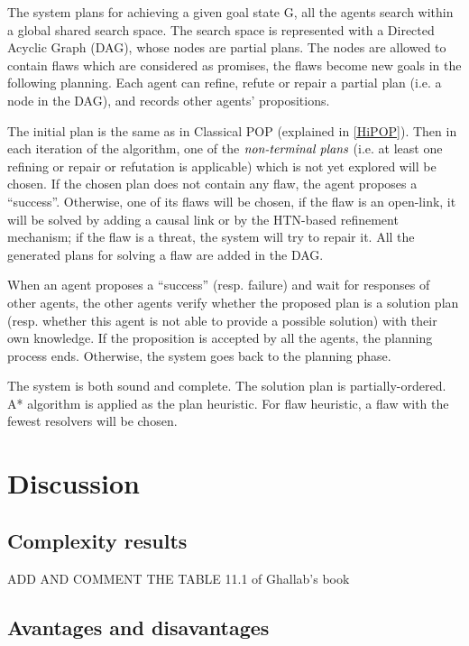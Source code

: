 The system plans for achieving a given goal state G, all the agents search within a global shared search space. The search space is represented with a Directed Acyclic Graph (DAG), whose nodes are partial plans. The nodes are allowed to contain flaws which are considered as promises, the flaws become new goals in the following planning. Each agent can refine, refute or repair a partial plan (i.e. a node in the DAG), and records other agents’ propositions. 

The initial plan is the same as in Classical POP (explained in \autoref{HiPOP}). Then in each iteration of the algorithm, one of the $\emph{non-terminal plans}$ (i.e. at least one refining or repair or refutation is applicable) which is not yet explored will be chosen. If the chosen plan does not contain any flaw, the agent proposes a “success”. Otherwise, one of its flaws will be chosen, if the flaw is an open-link, it will be solved by adding a causal link or by the HTN-based refinement mechanism; if the flaw is a threat, the system will try to repair it. All the generated plans for solving a flaw are added in the DAG.

When an agent proposes a “success” (resp. failure) and wait for responses of other agents, the other agents verify whether the proposed plan is a solution plan (resp. whether this agent is not able to provide a possible solution) with their own knowledge. If the proposition is accepted by all the agents, the planning process ends. Otherwise, the system goes back to the planning phase.

The system is both sound and complete. The solution plan is partially-ordered. A* algorithm is applied as the plan heuristic. For flaw heuristic, a flaw with the fewest resolvers will be chosen. 

\section{Discussion}
\label{Sec:Discussion}

\subsection{Complexity results}

ADD AND COMMENT THE TABLE 11.1 of Ghallab's book

\subsection{Avantages and disavantages}

